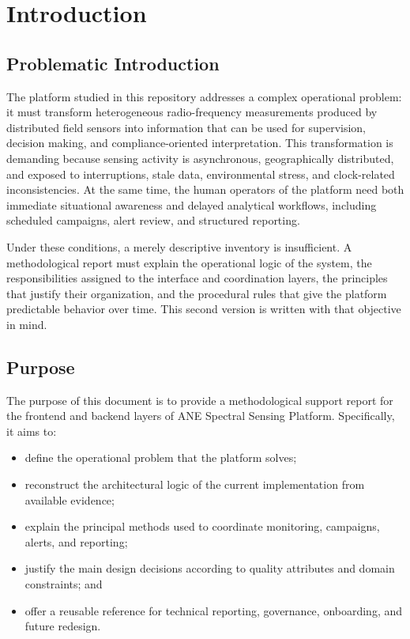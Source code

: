 \documentclass[11pt,a4paper]{article}
\newcommand{\project}{ANE Spectral Sensing Platform}
\begin{document}
\tableofcontents
\newpage

\section{Introduction}

\subsection{Problematic Introduction}
The platform studied in this repository addresses a complex operational problem: it must transform heterogeneous radio-frequency measurements produced by distributed field sensors into information that can be used for supervision, decision making, and compliance-oriented interpretation. This transformation is demanding because sensing activity is asynchronous, geographically distributed, and exposed to interruptions, stale data, environmental stress, and clock-related inconsistencies. At the same time, the human operators of the platform need both immediate situational awareness and delayed analytical workflows, including scheduled campaigns, alert review, and structured reporting.

Under these conditions, a merely descriptive inventory is insufficient. A methodological report must explain the operational logic of the system, the responsibilities assigned to the interface and coordination layers, the principles that justify their organization, and the procedural rules that give the platform predictable behavior over time. This second version is written with that objective in mind.

\subsection{Purpose}
The purpose of this document is to provide a methodological support report for the frontend and backend layers of \project. Specifically, it aims to:

\begin{itemize}
  \item define the operational problem that the platform solves;
  \item reconstruct the architectural logic of the current implementation from available evidence;
  \item explain the principal methods used to coordinate monitoring, campaigns, alerts, and reporting;
  \item justify the main design decisions according to quality attributes and domain constraints; and
  \item offer a reusable reference for technical reporting, governance, onboarding, and future redesign.
\end{itemize}
\end{document}
